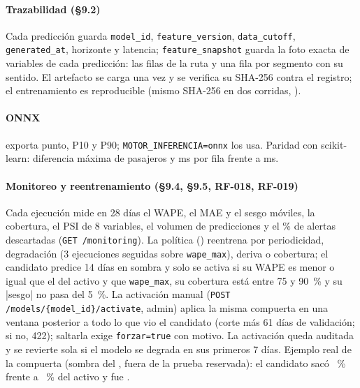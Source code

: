 \documentclass[10pt,a4paper]{article}
\begin{document}
\paragraph{Trazabilidad (§9.2)} Cada predicción guarda \texttt{model\_id}, \texttt{feature\_version},
\texttt{data\_cutoff}, \texttt{generated\_at}, horizonte y latencia; \texttt{feature\_snapshot} guarda la foto exacta de
variables de cada predicción: las filas de la ruta y una fila por segmento con su sentido. El artefacto se carga una vez y
se verifica su SHA-256 contra el registro; el entrenamiento es reproducible (mismo SHA-256 en dos corridas,
).

\paragraph{ONNX}  exporta punto, P10 y P90; \texttt{MOTOR\_INFERENCIA=onnx} los usa.
Paridad con scikit-learn: diferencia máxima de \OnnxDifMax{} pasajeros y \OnnxMsFila{} ms por fila frente a
\SklearnMsFila{} ms. 

\paragraph{Monitoreo y reentrenamiento (§9.4, §9.5, RF-018, RF-019)} Cada ejecución mide en 28 días el WAPE, el MAE y
el sesgo móviles, la cobertura, el PSI de 8 variables, el volumen de predicciones y el \% de alertas descartadas
(\texttt{GET /monitoring}). La política () reentrena por periodicidad, degradación (3
ejecuciones seguidas sobre \texttt{wape\_max}), deriva o cobertura; el candidato predice 14 días en sombra y solo se
activa si su WAPE es menor o igual que el del activo y que \texttt{wape\_max}, su cobertura está entre 75 y 90~\% y su
|sesgo| no pasa del 5~\%. La activación manual (\texttt{POST /models/\{model\_id\}/activate}, admin) aplica la misma compuerta
en una ventana posterior a todo lo que vio el candidato (corte más 61 días de validación; si no, 422); saltarla exige
\texttt{forzar=true} con motivo. La activación queda auditada y se revierte sola si el modelo se degrada en sus primeros
7 días. Ejemplo real de la compuerta (sombra del \GateVentana, fuera de la prueba reservada): el candidato
\GateCandidato{} sacó \GateWAPECand~\% frente a \GateWAPEAct~\% del activo y fue \GateDecision.
\end{document}
